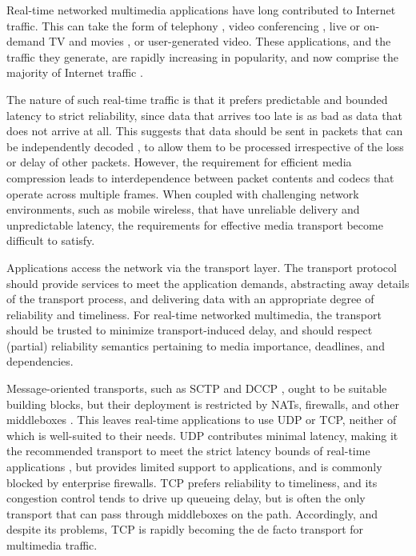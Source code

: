 
Real-time networked multimedia applications have long contributed to
Internet traffic. This can take the form of telephony \cite{RFC3261},
video conferencing \cite{jennings:2013:webrtc}, live or on-demand TV
and movies \cite{cha:2008:watching-tv,stockhammer:2011:dash}, or
user-generated video. These applications, and the traffic they generate,
are rapidly increasing in popularity, and now
comprise the majority of Internet traffic \cite{cisco:2013:vni-forecast}.

The nature of such real-time traffic is that it prefers predictable and bounded
latency to strict reliability, since data that arrives too late is as
bad as data that does not arrive at all. This suggests that data should
be sent in packets that can be independently decoded
\cite{clark:1990:architecture}, to allow them to be processed irrespective
of the loss or delay of other packets. However, the requirement for efficient media
compression leads to interdependence between packet contents and codecs
that operate across multiple frames.  When coupled with
challenging network environments, such as mobile wireless, that have
unreliable delivery and unpredictable latency, the requirements for
effective media transport become difficult to satisfy.

Applications access the network via the transport layer. The transport
protocol should provide services to meet the application demands,
abstracting away details of the transport process, and delivering data with an
appropriate degree of reliability and timeliness. For real-time networked
multimedia, the transport should be trusted to minimize transport-induced
delay, and should respect (partial) reliability semantics pertaining to
media importance, deadlines, and dependencies.

Message-oriented transports, such as SCTP \cite{rfc:4960} and DCCP
\cite{rfc:4340}, ought to be suitable building blocks, but their deployment
is restricted by NATs, firewalls, and other middleboxes
\cite{hatonen:2010:gateway}. This leaves real-time applications to use
UDP or TCP, neither of which is well-suited to their needs. UDP
contributes minimal latency, making it the recommended transport to meet the
strict latency bounds of real-time applications
\cite{draft-ietf-rtcweb-rtp-usage}, but provides limited support to
applications, and is commonly blocked by enterprise firewalls. TCP prefers
reliability to timeliness, and its congestion control tends to drive up
queueing delay, but is often the only transport that can pass through
middleboxes on the path. Accordingly, and despite its problems,
TCP is rapidly becoming the de facto transport for multimedia traffic.

